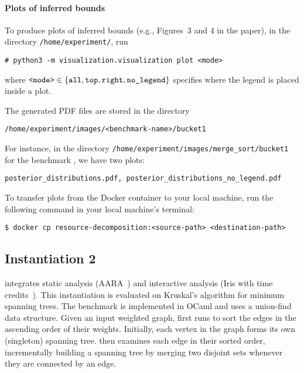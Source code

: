 \paragraph{Plots of inferred bounds}

To produce plots of inferred bounds (e.g., Figures~3 and 4 in the paper), in the
directory \texttt{/home/experiment/}, run
\begin{verbatim}
# python3 -m visualization.visualization plot <mode>
\end{verbatim}
where $\texttt{<mode>} \in \{ {\texttt{all}, \texttt{top}, \texttt{right},
    \texttt{no\_legend}} \}$ specifies where the legend is placed inside a plot.

The generated PDF files are stored in the directory
\begin{verbatim}
/home/experiment/images/<benchmark-name>/bucket1
\end{verbatim}
%
For instance, in the directory \texttt{/home/experiment/images/merge\_sort/bucket1}
for the benchmark \mergesort{}, we have two plots:
\begin{verbatim}
posterior_distributions.pdf, posterior_distributions_no_legend.pdf
\end{verbatim}

To transfer plots from the Docker container to your local machine, run the
following command in your local machine's terminal:
\begin{verbatim}
$ docker cp resource-decomposition:<source-path> <destination-path>
\end{verbatim}

\subsection{Instantiation 2}
\label{sec:step-by-step-instructions:instantiation-2}

 integrates static analysis
(AARA~\citep{Hoffmann2011a,Hoffmann2017}) and interactive analysis (Iris with
time credits~\citep{Chargueraud2019}).
%
This instantiation is evaluated on Kruskal's algorithm for minimum spanning
trees.
%
The benchmark \kruskal{} is implemented in OCaml and uses a union-find data
structure.
%
Given an input weighted graph, \kruskal{} first runs \mergesort{} to sort the
edges in the ascending order of their weights.
%
Initially, each vertex in the graph forms its own (singleton) spanning tree.
%
\kruskal{} then examines each edge in their sorted order, incrementally building
a spanning tree by merging two disjoint sets whenever they are connected by an
edge.


